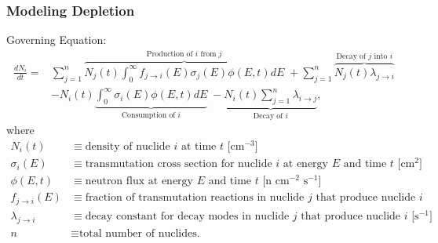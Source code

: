 \begin{frame}
  \frametitle{Modeling Depletion}
  Governing Equation:
    \begin{equation}
      \label{eq:depletion}
      \begin{split}
          \frac{dN_i}{dt} = & \sum\limits_{j=1}^n \overbrace{N_j(t)\int_0^\infty
            f_{j \rightarrow i}(E) \sigma_j (E) \phi(E,t) dE}^\text{Production
            of $i$ from $j$} \;+
          \sum\limits_{j=1}^n \overbrace{N_j(t) \lambda_{j\rightarrow
            i}}^\text{Decay of $j$ into $i$}
          \\ & - N_i(t)\underbrace{\int_0^\infty \sigma_i (E) \phi(E,t)
            dE}_\text{Consumption of $i$} \; -
          \underbrace{N_i(t)\sum\limits_{j=1}^n \lambda_{i\rightarrow
            j}}_\text{Decay of $i$} ,
      \end{split}
    \end{equation}
    where
    \begin{equation*}
      \begin{split}
          N_i(t) &\equiv \text{density of nuclide $i$ at time $t$ [cm$^{-3}$]}\\
        \sigma_i(E) &\equiv \text{transmutation cross section for nuclide $i$ at energy $E$ and time $t$ [cm$^{2}$]}\\
            \phi(E,t) &\equiv \text{neutron flux at energy $E$ and time $t$ [n
            cm$^{-2}$ s$^{-1}$]} \\
        f_{j \rightarrow i}(E) &\equiv \text{fraction of transmutation reactions in nuclide $j$ that produce nuclide $i$} \\
        \lambda_{j \rightarrow i} &\equiv \text{decay constant for decay modes
        in nuclide $j$ that produce nuclide $i$ [s$^{-1}$]}\\
        n &\equiv \text{total number of nuclides.}
      \end{split}
    \end{equation*}
\end{frame}
